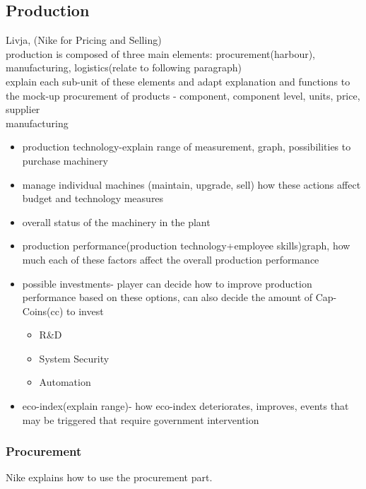 \documentclass[11pt,titlepage,oneside,openany]{book}
\begin{document}
\subsection{Production}
Livja, (Nike for Pricing and Selling) \\
 production is composed of three main elements: procurement(harbour), manufacturing, logistics(relate to following paragraph)\\
explain each sub-unit of these elements and adapt explanation and functions to the mock-up
procurement of products - component, component level, units, price, supplier \\
manufacturing
\begin{itemize} 
\item production technology-explain range of measurement, graph, possibilities to purchase machinery
\item manage individual machines (maintain, upgrade, sell) how these actions affect budget and technology measures
\item overall status of the machinery in the plant
\item production performance(production technology+employee skills)graph, how much each of these factors affect the overall production performance
 \item possible investments- player can decide how to improve production performance based on these options, can also decide the amount of Cap-Coins(cc) to invest
 \begin{itemize} 
 \item R\&D
 \item System Security
 \item Automation
 \end{itemize}
 \item eco-index(explain range)- how eco-index deteriorates, improves, events that may be triggered that require government intervention
\end{itemize}

\subsubsection{Procurement}
Nike explains how to use the procurement part.
\end{document}
